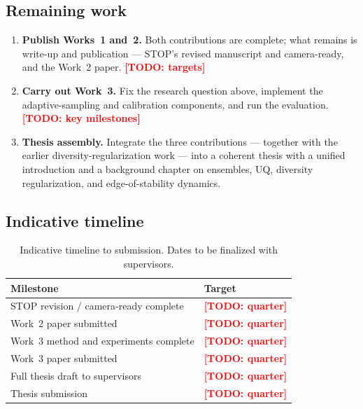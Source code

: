 \documentclass[11pt]{article}
\newcommand{\TODO}[1]{\textcolor{red}{\textbf{[TODO: #1]}}}
\begin{document}
\subsection{Remaining work}
\begin{enumerate}[itemsep=2pt]
  \item \textbf{Publish Works~1 and~2.} Both contributions are complete; what remains is
  write-up and publication --- STOP's revised manuscript and camera-ready, and the Work~2 paper.
  \TODO{targets}
  \item \textbf{Carry out Work~3.} Fix the research question above, implement the adaptive-sampling
  and calibration components, and run the evaluation. \TODO{key milestones}
  \item \textbf{Thesis assembly.} Integrate the three contributions --- together with the earlier
  diversity-regularization work --- into a coherent thesis with a unified introduction and a
  background chapter on ensembles, UQ, diversity regularization, and edge-of-stability dynamics.
\end{enumerate}

\subsection{Indicative timeline}
\begin{table}[ht]
  \centering
  \caption{Indicative timeline to submission. Dates to be finalized with supervisors.}
  \label{tab:timeline}
  \small
  \begin{tabular}{p{7.6cm} l}
    \toprule
    Milestone & Target \\
    \midrule
    STOP revision / camera-ready complete             & \TODO{quarter} \\
    Work~2 paper submitted                             & \TODO{quarter} \\
    Work~3 method and experiments complete             & \TODO{quarter} \\
    Work~3 paper submitted                             & \TODO{quarter} \\
    Full thesis draft to supervisors                   & \TODO{quarter} \\
    Thesis submission                                  & \TODO{quarter} \\
    \bottomrule
  \end{tabular}
\end{table}
\end{document}
